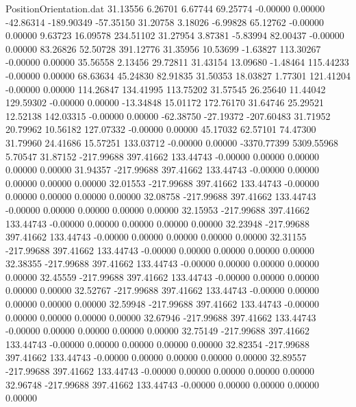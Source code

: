 \begin{filecontents}{PositionOrientation.dat}
  31.13556    6.26701    6.67744    69.25774   -0.00000    0.00000  -42.86314 -189.90349  -57.35150
  31.20758    3.18026   -6.99828    65.12762   -0.00000    0.00000    9.63723   16.09578  234.51102
  31.27954    3.87381   -5.83994    82.00437   -0.00000    0.00000   83.26826   52.50728  391.12776
  31.35956   10.53699   -1.63827   113.30267   -0.00000    0.00000   35.56558    2.13456   29.72811
  31.43154   13.09680   -1.48464   115.44233   -0.00000    0.00000   68.63634   45.24830   82.91835
  31.50353   18.03827    1.77301   121.41204   -0.00000    0.00000  114.26847  134.41995  113.75202
  31.57545   26.25640   11.44042   129.59302   -0.00000    0.00000  -13.34848   15.01172  172.76170
  31.64746   25.29521   12.52138   142.03315   -0.00000    0.00000  -62.38750  -27.19372 -207.60483
  31.71952   20.79962   10.56182   127.07332   -0.00000    0.00000   45.17032   62.57101   74.47300
  31.79960   24.41686   15.57251   133.03712   -0.00000    0.00000 -3370.77399 5309.55968    5.70547
  31.87152 -217.99688  397.41662   133.44743   -0.00000    0.00000    0.00000    0.00000    0.00000
  31.94357 -217.99688  397.41662   133.44743   -0.00000    0.00000    0.00000    0.00000    0.00000
  32.01553 -217.99688  397.41662   133.44743   -0.00000    0.00000    0.00000    0.00000    0.00000
  32.08758 -217.99688  397.41662   133.44743   -0.00000    0.00000    0.00000    0.00000    0.00000
  32.15953 -217.99688  397.41662   133.44743   -0.00000    0.00000    0.00000    0.00000    0.00000
  32.23948 -217.99688  397.41662   133.44743   -0.00000    0.00000    0.00000    0.00000    0.00000
  32.31155 -217.99688  397.41662   133.44743   -0.00000    0.00000    0.00000    0.00000    0.00000
  32.38355 -217.99688  397.41662   133.44743   -0.00000    0.00000    0.00000    0.00000    0.00000
  32.45559 -217.99688  397.41662   133.44743   -0.00000    0.00000    0.00000    0.00000    0.00000
  32.52767 -217.99688  397.41662   133.44743   -0.00000    0.00000    0.00000    0.00000    0.00000
  32.59948 -217.99688  397.41662   133.44743   -0.00000    0.00000    0.00000    0.00000    0.00000
  32.67946 -217.99688  397.41662   133.44743   -0.00000    0.00000    0.00000    0.00000    0.00000
  32.75149 -217.99688  397.41662   133.44743   -0.00000    0.00000    0.00000    0.00000    0.00000
  32.82354 -217.99688  397.41662   133.44743   -0.00000    0.00000    0.00000    0.00000    0.00000
  32.89557 -217.99688  397.41662   133.44743   -0.00000    0.00000    0.00000    0.00000    0.00000
  32.96748 -217.99688  397.41662   133.44743   -0.00000    0.00000    0.00000    0.00000    0.00000

\end{filecontents}
